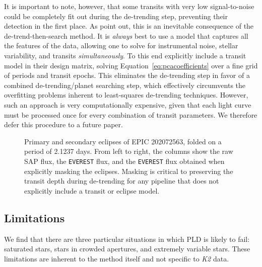\documentclass[]{emulateapj}
\begin{document}
It is important to note, however, that some transits with very low signal-to-noise could 
be completely fit out during the de-trending step, preventing their detection in 
the first place. As \cite{DFM15} point out, this is an inevitable
consequence of the de-trend-then-search method. It is \emph{always} best to use
a model that captures all the features of the data, allowing one to solve for 
instrumental noise, stellar variability, and transits \emph{simultaneously}. To this end
\cite{DFM15} explicitly include a transit model in their design matrix, solving
Equation~\ref{eq:pcacoefficients} over a fine grid of periods and transit epochs. This
eliminates the de-trending step in favor of a combined de-trending/planet
searching step, which effectively circumvents the overfitting problems inherent to
least-squares de-trending techniques. However, such an approach is very computationally
expensive, given that each light curve must be processed once for every combination
of transit parameters. We therefore defer this procedure to a future paper.

\begin{figure}[h]
  \begin{center}
       \caption{Primary and secondary eclipses of EPIC 202072563, folded
                on a period of 2.1237 days. From left to right, the columns
                show the raw SAP flux, the \texttt{EVEREST} flux, and the \texttt{EVEREST}
                flux obtained when explicitly masking the eclipses. Masking
                is critical to preserving the transit depth during de-trending
                for any pipeline that does not explicitly include a transit or
                eclipse model.}
     \label{fig:202072563}
  \end{center}
\end{figure}

\subsection{Limitations}
\label{sec:limitations}
We find that there are three particular situations in which PLD is likely to fail: saturated stars, 
stars in crowded apertures, and extremely variable stars. These limitations are inherent to the 
method itself and not specific to \emph{K2} data.
\end{document}
